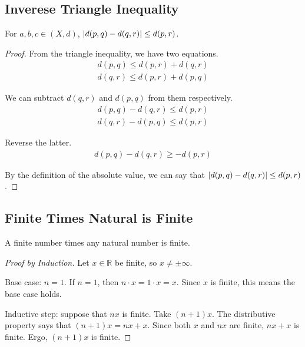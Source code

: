 \documentclass[11pt]{article}
\begin{document}
    \subsection{Inverese Triangle Inequality}
        For $a, b, c \in (X,d)$, $\left| d(p,q) - d(q,r) \right| \leq d(p,r)$.
        \begin{proof}
            From the triangle inequality, we have two equations.
            \begin{gather}
                d(p,q) \leq d(p,r) + d(q,r)\\
                d(q,r) \leq d(p,r) + d(p,q)
            \end{gather}

            We can subtract $d(q,r)$ and $d(p,q)$ from them respectively.
            \begin{gather}
                d(p,q) - d(q,r) \leq d(p,r)\\
                d(q,r) - d(p,q) \leq d(p,r)
            \end{gather}

            Reverse the latter.
            \begin{gather}
                d(p,q) - d(q,r) \geq -d(p,r)
            \end{gather}

            By the definition of the absolute value, we can say that $\left| d(p,q) - d(q,r) \right| \leq d(p,r)$.
        \end{proof}

    \subsection{Finite Times Natural is Finite}
        A finite number times any natural number is finite.
        \begin{proof}[Proof by Induction]
            Let $x \in \mathbb{R}$ be finite, so $x \neq \pm \infty$.

            Base case: $n = 1$.
            If $n = 1$, then $n \cdot x = 1 \cdot x = x$.
            Since $x$ is finite, this means the base case holds.

            Inductive step: suppose that $nx$ is finite.
            Take $(n + 1)x$.
            The distributive property says that $(n + 1)x = nx + x$.
            Since both $x$ and $nx$ are finite, $nx + x$ is finite.
            Ergo, $(n + 1)x$ is finite.
        \end{proof}
\end{document}
